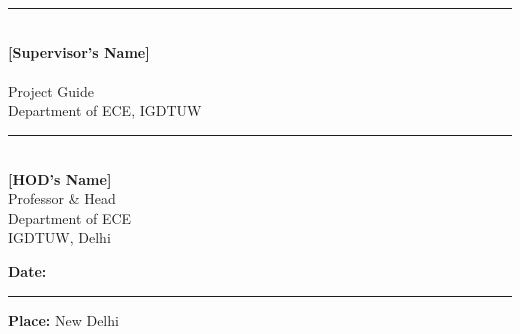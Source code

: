\vspace{2.5cm}

\noindent
\begin{minipage}[t]{0.48\textwidth}
    \rule{5cm}{0.4pt}\\
    \textbf{[Supervisor's Name]}\\
    [Designation]\\
    Project Guide\\
    Department of ECE, IGDTUW
\end{minipage}
\hfill
\begin{minipage}[t]{0.48\textwidth}
    \raggedleft
    \rule{5cm}{0.4pt}\\
    \textbf{[HOD's Name]}\\
    Professor \& Head\\
    Department of ECE\\
    IGDTUW, Delhi
\end{minipage}

\vfill
\noindent
\textbf{Date:} \rule{3cm}{0.4pt} \hfill \textbf{Place:} New Delhi

\clearpage

